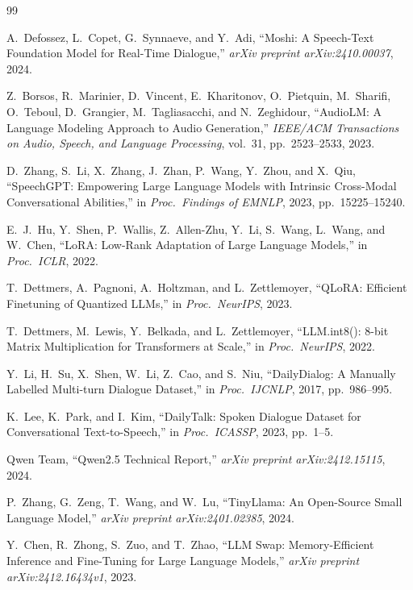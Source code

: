 \documentclass[conference]{IEEEtran}
\begin{document}
\begin{thebibliography}{99}

A.\ Defossez, L.\ Copet, G.\ Synnaeve, and Y.\ Adi,
``Moshi: A Speech-Text Foundation Model for Real-Time Dialogue,''
\emph{arXiv preprint arXiv:2410.00037}, 2024.

Z.\ Borsos, R.\ Marinier, D.\ Vincent, E.\ Kharitonov, O.\ Pietquin,
M.\ Sharifi, O.\ Teboul, D.\ Grangier, M.\ Tagliasacchi, and N.\ Zeghidour,
``AudioLM: A Language Modeling Approach to Audio Generation,''
\emph{IEEE/ACM Transactions on Audio, Speech, and Language Processing},
vol.\ 31, pp.\ 2523--2533, 2023.

D.\ Zhang, S.\ Li, X.\ Zhang, J.\ Zhan, P.\ Wang, Y.\ Zhou, and X.\ Qiu,
``SpeechGPT: Empowering Large Language Models with Intrinsic Cross-Modal
Conversational Abilities,''
in \emph{Proc.\ Findings of EMNLP}, 2023, pp.\ 15225--15240.

E.\ J.\ Hu, Y.\ Shen, P.\ Wallis, Z.\ Allen-Zhu, Y.\ Li, S.\ Wang,
L.\ Wang, and W.\ Chen,
``LoRA: Low-Rank Adaptation of Large Language Models,''
in \emph{Proc.\ ICLR}, 2022.

T.\ Dettmers, A.\ Pagnoni, A.\ Holtzman, and L.\ Zettlemoyer,
``QLoRA: Efficient Finetuning of Quantized LLMs,''
in \emph{Proc.\ NeurIPS}, 2023.

T.\ Dettmers, M.\ Lewis, Y.\ Belkada, and L.\ Zettlemoyer,
``LLM.int8(): 8-bit Matrix Multiplication for Transformers at Scale,''
in \emph{Proc.\ NeurIPS}, 2022.

Y.\ Li, H.\ Su, X.\ Shen, W.\ Li, Z.\ Cao, and S.\ Niu,
``DailyDialog: A Manually Labelled Multi-turn Dialogue Dataset,''
in \emph{Proc.\ IJCNLP}, 2017, pp.\ 986--995.

K.\ Lee, K.\ Park, and I.\ Kim,
``DailyTalk: Spoken Dialogue Dataset for Conversational Text-to-Speech,''
in \emph{Proc.\ ICASSP}, 2023, pp.\ 1--5.

Qwen Team,
``Qwen2.5 Technical Report,''
\emph{arXiv preprint arXiv:2412.15115}, 2024.

P.\ Zhang, G.\ Zeng, T.\ Wang, and W.\ Lu,
``TinyLlama: An Open-Source Small Language Model,''
\emph{arXiv preprint arXiv:2401.02385}, 2024.

Y.\ Chen, R.\ Zhong, S.\ Zuo, and T.\ Zhao,
``LLM Swap: Memory-Efficient Inference and Fine-Tuning for Large Language Models,''
\emph{arXiv preprint arXiv:2412.16434v1}, 2023.

\end{thebibliography}
\end{document}
